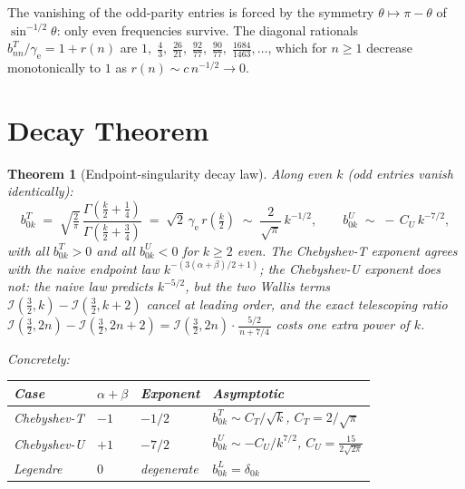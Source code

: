 \documentclass[11pt,a4paper]{article}
\newtheorem{theorem}{Theorem}[section]
\newcommand{\G}{\Gamma}
\begin{document}
\noindent The vanishing of the odd-parity entries is forced by the symmetry
$\theta\mapsto\pi-\theta$ of $\sin^{-1/2}\theta$: only even frequencies survive.
The diagonal rationals $b_{nn}^T/\gamma_\mathrm{e}=1+r(n)$ are
$1,\;\tfrac43,\;\tfrac{26}{21},\;\tfrac{92}{77},\;\tfrac{90}{77},\;
\tfrac{1684}{1463},\ldots$, which for $n\ge1$ decrease monotonically to $1$
as $r(n)\sim c\,n^{-1/2}\to0$.

\section{Decay Theorem}

\begin{theorem}[Endpoint-singularity decay law]\label{thm:decay}
  Along even $k$ (odd entries vanish identically):
  \[
    b_{0k}^T \;=\; \sqrt{\tfrac{2}{\pi}}\,
    \frac{\G(\tfrac k2+\tfrac14)}{\G(\tfrac k2+\tfrac34)}
    \;=\; \sqrt2\,\gamma_\mathrm{e}\,r(\tfrac k2)
    \;\sim\; \frac{2}{\sqrt{\pi}}\,k^{-1/2},
    \qquad
    b_{0k}^U \;\sim\; -\,C_U\,k^{-7/2},
  \]
  with all $b_{0k}^T>0$ and all $b_{0k}^U<0$ for $k\ge2$ even.
  The Chebyshev-T exponent agrees with the naive endpoint law
  $k^{-(3(\alpha+\beta)/2+1)}$; the Chebyshev-U exponent does \emph{not}:
  the naive law predicts $k^{-5/2}$, but the two Wallis terms
  $\mathcal{I}(\tfrac32,k)-\mathcal{I}(\tfrac32,k{+}2)$ cancel at leading
  order, and the exact telescoping ratio
  $\mathcal{I}(\tfrac32,2n)-\mathcal{I}(\tfrac32,2n{+}2)
   =\mathcal{I}(\tfrac32,2n)\cdot\frac{5/2}{\,n+7/4\,}$
  costs one extra power of $k$.

  \medskip\noindent
  Concretely:
  \begin{center}
  \begin{tabular}{@{}llll@{}}
  \toprule
  Case & $\alpha+\beta$ & Exponent & Asymptotic \\
  \midrule
  Chebyshev-T & $-1$ & $-1/2$ & $b_{0k}^T \sim C_T/\sqrt{k}$,\; $C_T=2/\sqrt{\pi}$ \\
  Chebyshev-U & $+1$ & $-7/2$ & $b_{0k}^U \sim -C_U/k^{7/2}$,\; $C_U=\tfrac{15}{2\sqrt{2\pi}}$ \\
  Legendre    & $0$ & degenerate & $b_{0k}^L=\delta_{0k}$ \\
  \bottomrule
  \end{tabular}
  \end{center}
\end{theorem}
\end{document}

